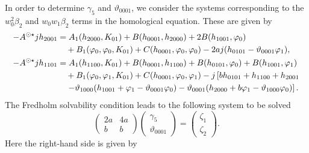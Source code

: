 In order to determine $\gamma_5$ and $\vartheta_{0001}$, we consider the systems
corresponding to the $w_0^2\beta_2$ and $w_0w_1\beta_2$ terms in the homological
equation. These are given by
\begin{equation}
\label{btdde:eq:Assh2001_Assh1101}
\begin{aligned}
-A^{\odot\star}jh_{2001} &= A_1(h_{2000},K_{01}) +B(h_{0001},h_{2000}) + 2 B(h_{1001},\varphi_0) \\
				& \quad + B_1(\varphi_0,\varphi_0,K_{01}) + C(h_{0001},\varphi_0,\varphi_0) - 2 a j( h_{0101} - \vartheta_{0001} \varphi_1), \\
-A^{\odot\star}jh_{1101} &= A_1(h_{1100},K_{01}) + B(h_{0001},h_{1100}) + B(h_{0101},\varphi_0) + B(h_{1001},\varphi_1)  \\
				& \quad  + B_1(\varphi_0,\varphi_1,K_{01}) + C(h_{0001},\varphi_0,\varphi_1) - j\left[b h_{0101} + h_{1100} + h_{2001} \right. \\
				& \quad \left. - \vartheta_{1000} (h_{1001} + \varphi_1 - \vartheta_{0001} \varphi_0) 
                               - \vartheta_{0001} (h_{2000} + b \varphi_1 - \vartheta_{1000} \varphi_0)\right]  .
\end{aligned}
\end{equation}
The Fredholm solvability condition leads to the following system to be solved
\begin{equation}
\label{btdde:eq:gamma_5_theta0001}
\begin{pmatrix}
				 2a &  4a \\
				  b &   b 
\end{pmatrix}
\begin{pmatrix}
				\gamma_5 \\
				\vartheta_{0001}
\end{pmatrix}
=
\begin{pmatrix}
				\zeta_1 \\
				\zeta_2 
\end{pmatrix}.
\end{equation}
Here the right-hand side is given by
